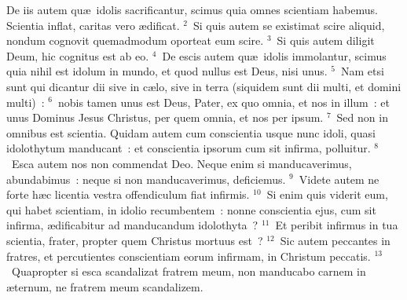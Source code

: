 \lettrine[lines=3,image=true,loversize=0.05,lraise=-0.03]{D}{}e iis autem qu\ae\ idolis sacrificantur, scimus quia omnes scientiam habemus. Scientia inflat, caritas vero \ae dificat.
${}^{2}$~Si quis autem se existimat scire aliquid, nondum cognovit quemadmodum oporteat eum scire.
${}^{3}$~Si quis autem diligit Deum, hic cognitus est ab eo.
${}^{4}$~De escis autem qu\ae\ idolis immolantur, scimus quia nihil est idolum in mundo, et quod nullus est Deus, nisi unus.
${}^{5}$~Nam etsi sunt qui dicantur dii sive in c\ae lo, sive in terra (siquidem sunt dii multi, et domini multi)~:
${}^{6}$~nobis tamen unus est Deus, Pater, ex quo omnia, et nos in illum~: et unus Dominus Jesus Christus, per quem omnia, et nos per ipsum.
${}^{7}$~Sed non in omnibus est scientia. Quidam autem cum conscientia usque nunc idoli, quasi idolothytum manducant~: et conscientia ipsorum cum sit infirma, polluitur.
${}^{8}$~Esca autem nos non commendat Deo. Neque enim si manducaverimus, abundabimus~: neque si non manducaverimus, deficiemus.
${}^{9}$~Videte autem ne forte h\ae c licentia vestra offendiculum fiat infirmis.
${}^{10}$~Si enim quis viderit eum, qui habet scientiam, in idolio recumbentem~: nonne conscientia ejus, cum sit infirma, \ae dificabitur ad manducandum idolothyta~?
${}^{11}$~Et peribit infirmus in tua scientia, frater, propter quem Christus mortuus est~?
${}^{12}$~Sic autem peccantes in fratres, et percutientes conscientiam eorum infirmam, in Christum peccatis.
${}^{13}$~Quapropter si esca scandalizat fratrem meum, non manducabo carnem in \ae ternum, ne fratrem meum scandalizem.

